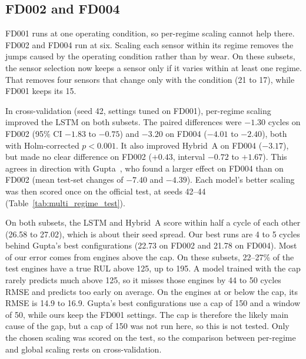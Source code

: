 \subsection{FD002 and FD004}
FD001 runs at one operating condition, so per-regime scaling cannot help
there. FD002 and FD004 run at six. Scaling each sensor within its regime
removes the jumps caused by the operating condition rather than by wear. On
these subsets, the sensor selection now keeps a sensor only if it varies
within at least one regime. That removes four sensors that change only with
the condition (21 to 17), while FD001 keeps its 15.

In cross-validation (seed 42, settings tuned on FD001), per-regime scaling
improved the LSTM on both subsets. The paired differences were $-1.30$ cycles
on FD002 (95\% CI $-1.83$ to $-0.75$) and $-3.20$ on FD004 ($-4.01$ to
$-2.40$), both with Holm-corrected $p<0.001$. It also improved Hybrid~A on
FD004 ($-3.17$), but made no clear difference on FD002 ($+0.43$, interval
$-0.72$ to $+1.67$). This agrees in direction with Gupta~\cite{Gupta2026auditing},
who found a larger effect on FD004 than on FD002 (mean test-set changes of
$-7.40$ and $-4.39$). Each model's better scaling was then scored once on the
official test, at seeds 42--44 (Table~\ref{tab:multi_regime_test}).

\begin{table}[t]
\centering
\caption{Official FD002 and FD004 test (259 and 248 engines), seeds 42--44.
Scaling: the setting chosen by cross-validation. The last three columns split
the error at the training cap: RMSE on engines whose true RUL at the last
cycle is at most 125, RMSE on those above it, and the share above it.}
\label{tab:multi_regime_test}
\footnotesize

\end{table}

On both subsets, the LSTM and Hybrid~A score within half a cycle of each
other (26.58 to 27.02), which is about their seed spread. Our best runs are
4 to 5 cycles behind Gupta's best configurations (22.73 on FD002 and 21.78 on
FD004). Most of our error comes from engines above the cap. On these
subsets, 22--27\% of the test engines have a true RUL above 125, up to 195. A
model trained with the cap rarely predicts much above 125, so it misses those
engines by 44 to 50 cycles RMSE and predicts too early on average. On the
engines at or below the cap, its RMSE is 14.9 to 16.9. Gupta's best
configurations use a cap of 150 and a window of 50, while ours keep the
FD001 settings. The cap is therefore the likely main cause of the gap, but a
cap of 150 was not run here, so this is not tested. Only the chosen scaling
was scored on the test, so the comparison between per-regime and global
scaling rests on cross-validation.

